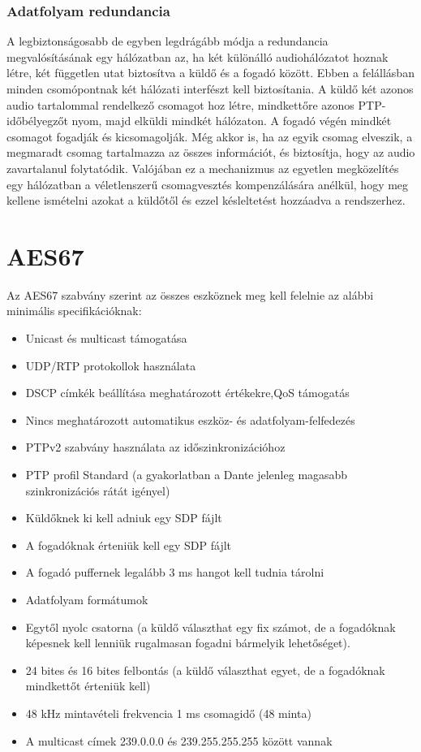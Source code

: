 \subsubsection{ Adatfolyam redundancia}
A legbiztonságosabb de egyben legdrágább módja a redundancia megvalósításának
egy hálózatban az, ha két különálló audiohálózatot hoznak létre, 
két független utat biztosítva a küldő és a fogadó között. 
Ebben a felállásban minden csomópontnak két hálózati interfészt
kell biztosítania. A küldő két azonos audio tartalommal rendelkező csomagot hoz létre,
mindkettőre azonos PTP-időbélyegzőt nyom, majd elküldi mindkét hálózaton.
A fogadó végén mindkét csomagot fogadják és kicsomagolják. Még akkor is, ha az egyik csomag
elveszik, a megmaradt csomag tartalmazza az összes információt, és biztosítja,
hogy az audio zavartalanul folytatódik. Valójában ez a mechanizmus az egyetlen
megközelítés egy hálózatban a véletlenszerű csomagvesztés kompenzálására anélkül,
hogy meg kellene ismételni azokat a küldőtől és ezzel késleltetést hozzáadva a rendszerhez.
\section{AES67}
Az AES67 szabvány szerint az összes eszköznek meg kell felelnie az
alábbi minimális specifikációknak: 

\begin{itemize}
	\item Unicast és multicast támogatása
	\item UDP/RTP protokollok használata
	\item DSCP címkék beállítása meghatározott értékekre,QoS támogatás 
	\item Nincs meghatározott automatikus eszköz- és adatfolyam-felfedezés 
	\item PTPv2 szabvány használata az időszinkronizációhoz
	\item PTP profil Standard (a gyakorlatban a Dante jelenleg magasabb szinkronizációs rátát igényel)
	\item Küldőknek ki kell adniuk egy SDP fájlt
	\item A fogadóknak érteniük kell egy SDP fájlt
	\item A fogadó puffernek legalább 3 ms hangot kell tudnia tárolni
	\item Adatfolyam formátumok
	\item Egytől nyolc csatorna (a küldő választhat egy fix számot, de a fogadóknak képesnek kell lenniük rugalmasan fogadni bármelyik lehetőséget).
	\item 24 bites és 16 bites felbontás (a küldő választhat egyet, de a fogadóknak mindkettőt érteniük kell) 
	\item 48 kHz mintavételi frekvencia 1 ms csomagidő (48 minta)
	\item A multicast címek 239.0.0.0 és 239.255.255.255 között vannak 
\end{itemize}


